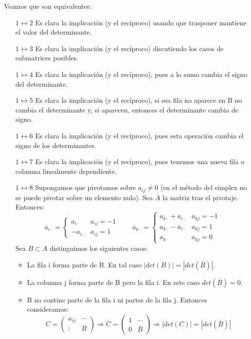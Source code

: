\documentclass[PM.tex]{subfiles}
\begin{document}
\begin{dem}
Veamos que son equivalentes:
\begin{itemize}
\item [$1 \leftrightarrow 2$] Es clara la implicación (y el recíproco) usando que trasponer mantiene el valor del determinante.
\item [$1 \leftrightarrow 3$] Es clara la implicación (y el recíproco) discutiendo los casos de submatrices posibles.
\item [$1 \leftrightarrow 4$] Es clara la implicación (y el recíproco), pues a lo sumo cambia el signo del determinante.
\item [$1 \leftrightarrow 5$] Es clara la implicación (y el recíproco), si esa fila no aparece en B no cambia el determinante y, si aparecen, entonces el determinante cambia de signo.
\item [$1 \leftrightarrow 6$] Es clara la implicación (y el recíproco), pues esta operación cambia el signo de los determinantes.
\item [$1 \leftrightarrow 7$] Es clara la implicación (y el recíproco), pues tenemos una nueva fila o columna linealmente dependiente.
\item [$1 \leftrightarrow 8$] Supongamos que pivotamos sobre $a_{ij}\neq 0$ (en el método del simplex no se puede pivotar sobre un elemento nulo). Sea $\overline{A}$ la matriz tras el pivotaje. Entonces:
\[
\overline{a}_{i\cdot}=
\begin{cases}
a_{i\cdot} & a_{ij}=-1\\
-a_{i\cdot} & a_{ij}=1
\end{cases}
\qquad
\overline{a}_{k\cdot}=
\begin{cases}
{a}_{k\cdot}+\overline{a}_{i\cdot} & a_{kj}=-1\\
{a}_{k\cdot}-\overline{a}_{i\cdot} & a_{kj}=1\\
{a}_{k\cdot} & a_{kj}=0
\end{cases}
\]
Sea $B\subset A$ distinguimos los siguientes casos:
\begin{itemize}
\item La fila i forma parte de B. En tal caso $|det(B)|=|det(\overline{B})|$.
\item La columna j forma parte de B pero la fila i. En este caso $det(\overline{B})=0$.
\item B no contine parte de la fila i ni partes de la fila j. Entonces consideramos:
\[
C=
\begin{pmatrix}
a_{ij} & \cdots\\
\vdots & B
\end{pmatrix} \Rightarrow \overline{C} = 
\begin{pmatrix}
1 & \cdots\\
0 & \overline{B}
\end{pmatrix} \Rightarrow |det(C)| = |det(\overline{B})|
\]
\end{itemize}
\end{itemize}
\end{dem}
\end{document}
